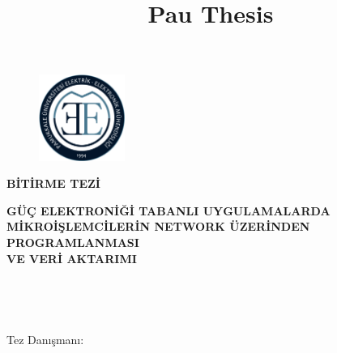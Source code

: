 \documentclass[]{esogu}			%
\begin{document}
\frontmatter %
\title{Pau Thesis}
\begin{titlingpage*}
\begin{center}
\large
\textbf{\MakeUppercase{\uni}}

\vspace{1pc}
\textbf{\MakeUppercase{\fakulte}}

\vspace{1pc}
\textbf{\MakeUppercase{\bolum}}
\vspace{2pc}

	\begin{figure}[h]
	\centering
	\includegraphics[width=0.25\textwidth]{gorseller/image1}
	\end{figure}
	\vspace{2pc}
  \Large
	\textbf{\unvan\space BİTİRME TEZİ}\\
  \vspace{1pc}							%
  \normalsize
\end{center}
\begin{framed}
\begin{center}
\textbf{GÜÇ ELEKTRONİĞİ TABANLI UYGULAMALARDA \\MİKROİŞLEMCİLERİN NETWORK ÜZERİNDEN PROGRAMLANMASI\\ VE VERİ AKTARIMI} %
\vspace{1pc}

\yazar\\
\vspace{1pc}

\teslim\\
\vspace{1pc}

Tez Danışmanı:\hspace{10mm} \danisman
\end{center}
\end{framed}
\end{titlingpage*}

\end{document}
